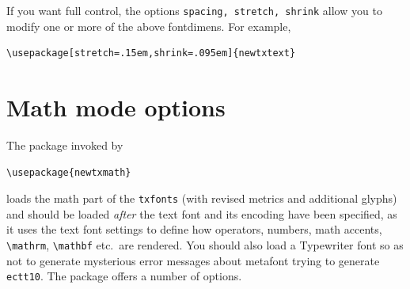 \documentclass[11pt]{article}
\theoremstyle{oldplain}
\theoremstyle{plain}
\begin{document}
If you want full control, the options {\tt spacing, stretch, shrink} allow you to modify one or more of the above fontdimens. For example,
\begin{verbatim}
\usepackage[stretch=.15em,shrink=.095em]{newtxtext}
\end{verbatim}

\section{Math mode options}
The package invoked by
\begin{verbatim}
\usepackage{newtxmath}
\end{verbatim}
loads the math part of the {\tt txfonts} (with revised metrics and additional glyphs) and should be loaded \emph{after} the text font and its encoding have been specified, as it uses the text font settings to define how operators, numbers, math accents, \verb|\mathrm|, \verb|\mathbf| etc.\ are rendered. You should also load a Typewriter font so as not to generate mysterious error messages about \textsf{metafont} trying to generate \texttt{ectt10}. The package offers a number of options.
\end{document}
